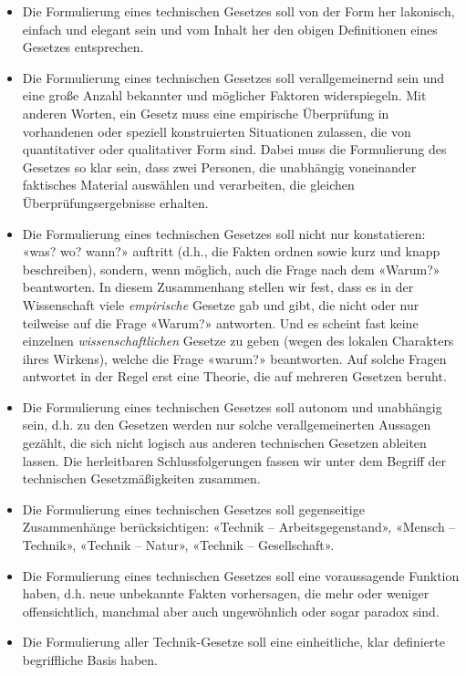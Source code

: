 \documentclass[11pt,a4paper]{article}
\begin{document}
\begin{itemize}
\item Die Formulierung eines technischen Gesetzes soll von der Form her
  lakonisch, einfach und elegant sein und vom Inhalt her den obigen
  Definitionen eines Gesetzes entsprechen.
\item Die Formulierung eines technischen Gesetzes soll verallgemeinernd sein
  und eine große Anzahl bekannter und möglicher Faktoren widerspiegeln. Mit
  anderen Worten, ein Gesetz muss eine empirische Überprüfung in vorhandenen
  oder speziell konstruierten Situationen zulassen, die von quantitativer oder
  qualitativer Form sind. Dabei muss die Formulierung des Gesetzes so klar
  sein, dass zwei Personen, die unabhängig voneinander faktisches Material
  auswählen und verarbeiten, die gleichen Überprüfungsergebnisse erhalten.
\item Die Formulierung eines technischen Gesetzes soll nicht nur konstatieren:
  «was? wo? wann?» auftritt (d.h., die Fakten ordnen sowie kurz und knapp
  beschreiben), sondern, wenn möglich, auch die Frage nach dem «Warum?»
  beantworten. In diesem Zusammenhang stellen wir fest, dass es in der
  Wissenschaft viele \emph{empirische} Gesetze gab und gibt, die nicht oder
  nur teilweise auf die Frage «Warum?» antworten. Und es scheint fast keine
  einzelnen \emph{wissenschaftlichen} Gesetze zu geben (wegen des lokalen
  Charakters ihres Wirkens), welche die Frage «warum?» beantworten.  Auf
  solche Fragen antwortet in der Regel erst eine Theorie, die auf mehreren
  Gesetzen beruht.
\item Die Formulierung eines technischen Gesetzes soll autonom und unabhängig
  sein, d.h. zu den Gesetzen werden nur solche verallgemeinerten Aussagen
  gezählt, die sich nicht logisch aus anderen technischen Gesetzen ableiten
  lassen. Die herleitbaren Schlussfolgerungen fassen wir unter dem Begriff der
  technischen Gesetzmäßigkeiten zusammen.
\item Die Formulierung eines technischen Gesetzes soll gegenseitige
  Zusammenhänge berück\-sich\-tigen: «Technik -- Arbeitsgegenstand», «Mensch
  -- Technik», «Technik -- Natur», «Technik -- Gesellschaft».
\item Die Formulierung eines technischen Gesetzes soll eine voraussagende
  Funktion haben, d.h. neue unbekannte Fakten vorhersagen, die mehr oder
  weniger offensichtlich, manchmal aber auch ungewöhnlich oder sogar paradox
  sind.
\item Die Formulierung aller Technik-Gesetze soll eine einheitliche, klar
  definierte begriffliche Basis haben.
\end{itemize}
\end{document}

